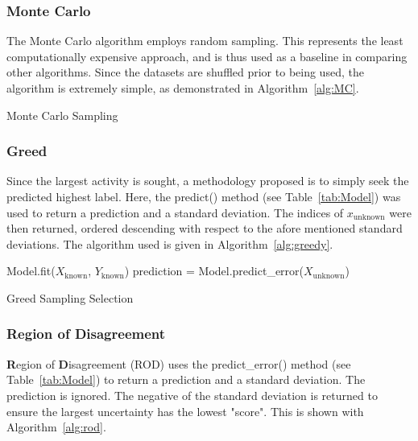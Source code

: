 \subsubsection{Monte Carlo}
The Monte Carlo algorithm employs random sampling. This represents the least computationally expensive approach, and is thus used as a baseline in comparing other algorithms. Since the datasets are shuffled prior to being used, the algorithm is extremely simple, as demonstrated in Algorithm~\ref{alg:MC}.

\begin{algorithm}[H]
    \caption{Monte Carlo Sampling}
    \label{alg:MC}\SetAlgoLined
\end{algorithm}

\subsubsection{Greed}
Since the largest activity is sought, a methodology proposed is to simply seek the predicted highest label. Here, the predict() method (see Table~\ref{tab:Model}) was used to return a prediction and a standard deviation. The indices of $x_\mathrm{unknown}$ were then returned, ordered descending with respect to the afore mentioned standard deviations. The algorithm used is given in Algorithm~\ref{alg:greedy}.

\begin{algorithm}[H]
    Model.fit($X_\mathrm{known}$, $Y_\mathrm{known}$)\;
    prediction = Model.predict\_error($X_\mathrm{unknown}$)\;
    \caption{Greed Sampling Selection}
    \label{alg:greedy}\SetAlgoLined
\end{algorithm}

\subsubsection{Region of Disagreement}
\textbf{R}egion of \textbf{D}isagreement (ROD) uses the predict\_error() method (see Table~\ref{tab:Model}) to return a prediction and a standard deviation. The prediction is ignored. The negative of the standard deviation is returned to ensure the largest uncertainty has the lowest "score". This is shown with Algorithm~\ref{alg:rod}.


